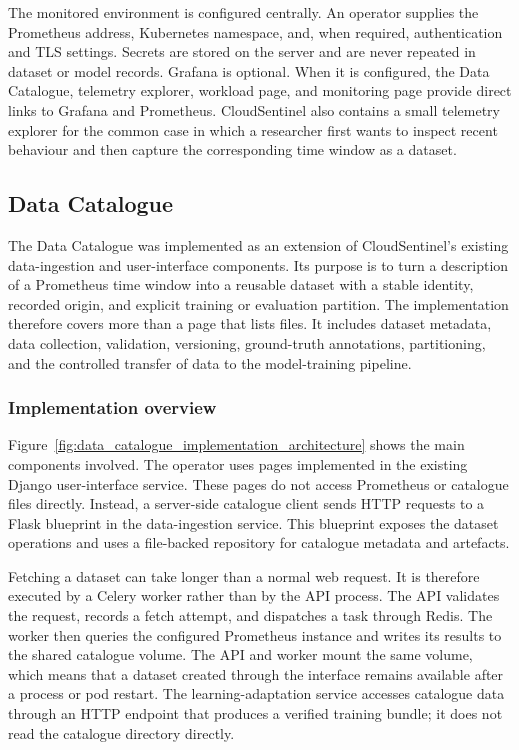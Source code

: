 The monitored environment is configured centrally. An operator supplies the Prometheus address, Kubernetes namespace, and, when required, authentication and TLS settings. Secrets are stored on the server and are never repeated in dataset or model records. Grafana is optional. When it is configured, the Data Catalogue, telemetry explorer, workload page, and monitoring page provide direct links to Grafana and Prometheus. CloudSentinel also contains a small telemetry explorer for the common case in which a researcher first wants to inspect recent behaviour and then capture the corresponding time window as a dataset.

\subsection{Data Catalogue}
The Data Catalogue was implemented as an extension of CloudSentinel's existing data-ingestion and user-interface components. Its purpose is to turn a description of a Prometheus time window into a reusable dataset with a stable identity, recorded origin, and explicit training or evaluation partition. The implementation therefore covers more than a page that lists files. It includes dataset metadata, data collection, validation, versioning, ground-truth annotations, partitioning, and the controlled transfer of data to the model-training pipeline.

\subsubsection{Implementation overview}

Figure~\ref{fig:data_catalogue_implementation_architecture} shows the main components involved. The operator uses pages implemented in the existing Django user-interface service. These pages do not access Prometheus or catalogue files directly. Instead, a server-side catalogue client sends HTTP requests to a Flask blueprint in the data-ingestion service. This blueprint exposes the dataset operations and uses a file-backed repository for catalogue metadata and artefacts.

Fetching a dataset can take longer than a normal web request. It is therefore executed by a Celery worker rather than by the API process. The API validates the request, records a fetch attempt, and dispatches a task through Redis. The worker then queries the configured Prometheus instance and writes its results to the shared catalogue volume. The API and worker mount the same volume, which means that a dataset created through the interface remains available after a process or pod restart. The learning-adaptation service accesses catalogue data through an HTTP endpoint that produces a verified training bundle; it does not read the catalogue directory directly.

